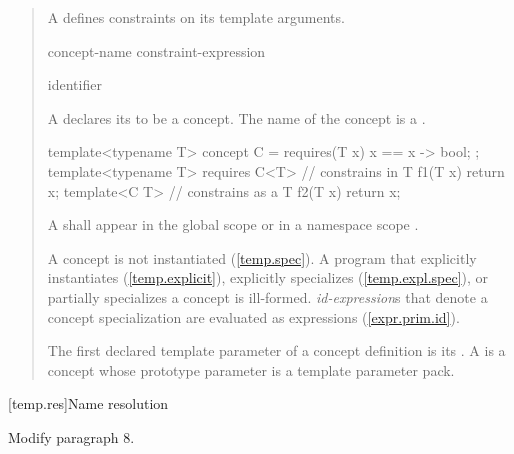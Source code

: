 \begin{quote}
\begin{addedblock}
\pnum A  defines constraints on its template arguments.

\begin{bnf}
\br
   concept-name \terminal{=} constraint-expression\br
\end{bnf}
\begin{bnf}
\br
  identifier
\end{bnf}

\pnum A  declares its 
to be a concept. The name of the concept is a .
\enterexample
\begin{codeblock}
template<typename T>
concept C = requires(T x) {
  { x == x } -> bool;
};
template<typename T> 
  requires C<T> //  constrains  in 
T f1(T x) { return x; }
template<C T> //  constrains  as a 
T f2(T x) { return x; }
\end{codeblock}
\exitexample

\pnum
A  shall appear in the global scope or in a
namespace scope .

\pnum
A concept is not instantiated (\ref{temp.spec}). 
A program that explicitly instantiates (\ref{temp.explicit}), explicitly 
specializes (\ref{temp.expl.spec}), or partially
specializes a concept is ill-formed. 
\enternote
\emph{id-expression}s that denote a concept specialization are evaluated as
expressions (\ref{expr.prim.id}).
\exitnote

\pnum
The first declared template parameter of a concept definition is its 
.
A  is a concept whose prototype parameter is a template 
parameter pack.
\end{addedblock}
\end{quote}

[temp.res]{Name resolution}

Modify paragraph 8.

